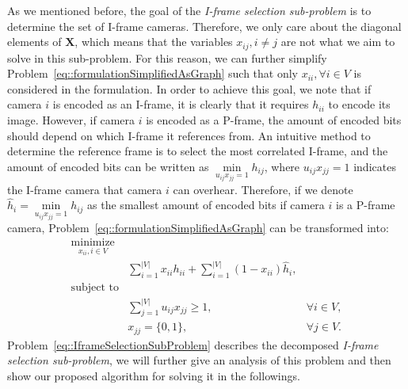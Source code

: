As we mentioned before, the goal of the \emph{I-frame selection sub-problem} is to determine the set of I-frame cameras.
Therefore, we only care about the diagonal elements of $\mathbf{X}$, which means that the variables $x_{ij}, i \neq j$ are not what we aim to solve in this sub-problem.
For this reason, we can further simplify Problem~\eqref{eq::formulationSimplifiedAsGraph} such that only $x_{ii}, \forall i \in V$ is considered in the formulation.
In order to achieve this goal, we note that if camera $i$ is encoded as an I-frame, it is clearly that it requires $h_{ii}$ to encode its image.
However, if camera $i$ is encoded as a P-frame, the amount of encoded bits should depend on which I-frame it references from.
An intuitive method to determine the reference frame is to select the most correlated I-frame, and the amount of encoded bits can be written as $\underset{u_{ij}x_{jj} = 1}{\min} h_{ij}$, where $u_{ij}x_{jj} = 1$ indicates the I-frame camera that camera $i$ can overhear.
Therefore, if we denote ${\hat{h}_i = \underset{u_{ij}x_{jj} = 1}{\min} h_{ij}}$ as the smallest amount of encoded bits if camera $i$ is a P-frame camera, Problem~\eqref{eq::formulationSimplifiedAsGraph} can be transformed into:
\begin{align}
\underset{x_{ii},i \in V}{\text{minimize}} & & \nonumber \\
	&\sum_{i=1}^{|V|} x_{ii}h_{ii} + \sum_{i=1}^{|V|} (1-x_{ii}) \hat{h}_i, & \nonumber \\
\text{subject to} & & \nonumber \\
	&\sum_{j=1}^{|V|} u_{ij} x_{jj} \geq 1, &\forall i \in V, \nonumber \\
	&x_{jj} = \{0,1\}, &\forall j \in V.  
\label{eq::IframeSelectionSubProblem}
\end{align}
Problem~\eqref{eq::IframeSelectionSubProblem} describes the decomposed \emph{I-frame selection sub-problem}, we will further give an analysis of this problem and then show our proposed algorithm for solving it in the followings.

%
